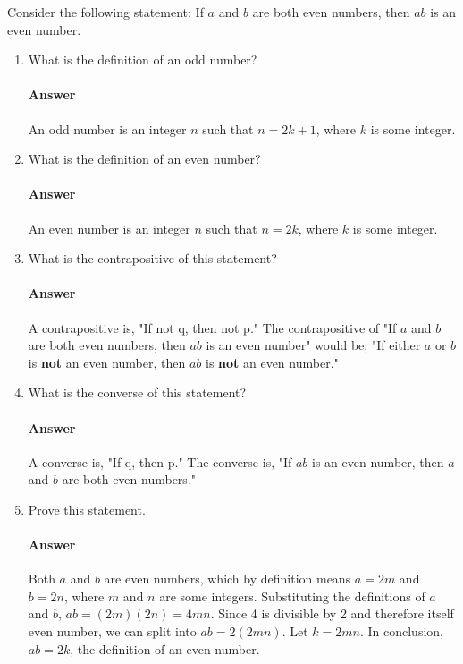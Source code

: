 \documentclass{article}
\begin{document}
Consider the following statement: If $a$ and $b$ are both even numbers, then $ab$ is
an even number.
\begin{enumerate}
    \item What is the definition of an odd number?

        \paragraph{Answer}{An odd number is an integer $n$ such that $n = 2k + 1$, where $k$ is some integer.}

    \item What is the definition of an even number?

        \paragraph{Answer}{An even number is an integer $n$ such that $n = 2k$, where $k$ is some integer.}

    \item What is the contrapositive of this statement?

        \paragraph{Answer}{A contrapositive is, "If not q, then not p." The contrapositive of "If $a$ and $b$ are both even numbers, then $ab$ is an even number" would be, "If either $a$ or $b$ is \textbf{not} an even number, then $ab$ is \textbf{not} an even number."}

    \item What is the converse of this statement?

        \paragraph{Answer}{A converse is, "If q, then p." The converse is, "If $ab$ is an even number, then $a$ and $b$ are both even numbers."}

    \item Prove this statement.

        \paragraph{Answer}{Both $a$ and $b$ are even numbers, which by definition means $a = 2m$ and $b = 2n$, where $m$ and $n$ are some integers. Substituting the definitions of $a$ and $b$, $ab = (2m)(2n) = 4mn$. Since 4 is divisible by 2 and therefore itself even number, we can split into $ab = 2(2mn)$. Let $k = 2mn$. In conclusion, $ab = 2k$, the definition of an even number.}

\end{enumerate}
\end{document}

